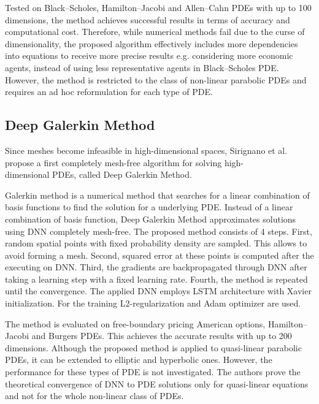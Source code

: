 Tested on Black--Scholes, Hamilton--Jacobi and Allen--Cahn PDEs with up to 100 dimensions, the method achieves successful results in terms of accuracy and computational cost. Therefore, while numerical methods fail due to the curse of dimensionality, the proposed algorithm effectively includes more dependencies into equations to receive more precise results e.g. considering more economic agents, instead of using less representative agents in Black--Scholes PDE. However, the method is restricted to the class of non-linear parabolic PDEs and requires an ad hoc reformulation for each type of PDE.     

\subsection{Deep Galerkin Method}
Since meshes become infeasible in high-dimensional spaces, Sirignano et al.~\cite{Sirignano18} propose a first completely mesh-free algorithm for solving high-\\dimensional PDEs, called Deep Galerkin Method. 

Galerkin method is a numerical method that searches for a linear combination of basis functions to find the solution for a underlying PDE. Instead of a linear combination of basis function, Deep Galerkin Method approximates solutions using DNN completely mesh-free. The proposed method consists of 4 steps. First, random spatial points with fixed probability density are sampled. This allows to avoid forming a mesh. Second, squared error at these points is computed after the executing on DNN. Third, the gradients are backpropagated through DNN after taking a learning step with a fixed learning rate. Fourth, the method is repeated until the convergence. The applied DNN employs LSTM architecture with Xavier initialization. For the training L2-regularization and Adam optimizer are used. 

The method is evaluated on free-boundary pricing American options, Hamilton--Jacobi and Burgers PDEs. This achieves the accurate results with up to 200 dimensions. Although the proposed method is applied to quasi-linear parabolic PDEs, it can be extended to elliptic and hyperbolic ones. However, the performance for these types of PDE is not investigated. The authors prove the theoretical convergence of DNN to PDE solutions only for quasi-linear equations and not for the whole non-linear class of PDEs.

